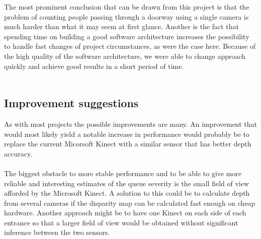The most prominent conclusion that can be drawn from this project is that the problem of counting people passing through a doorway using a single camera is much harder than what it may seem at first glance. Another is the fact that spending time on building a good software architecture increases the possibility to handle fast changes of project circumstances, as were the case here. Because of the high quality of the software architecture, we were able to change approach quickly and achieve good results in a short period of time.\\
\\


\subsection{Improvement suggestions}
As with most projects the possible improvements are many. An improvement that would most likely yield a notable increase in performance would probably be to replace the current Micorsoft Kinect with a similar sensor that has better depth accuracy. 
\\ \\The biggest obstacle to more stable performance and to be able to give more reliable and interesting estimates of the queue severity is the small field of view afforded by the Microsoft Kinect. A solution to this could be to calculate depth from several cameras if the disparity map can be calculated fast enough on cheap hardware. Another approach might be to have one Kinect on each side of each entrance so that a larger field of view would be obtained without significant inference between the two sensors.\\
\\
















